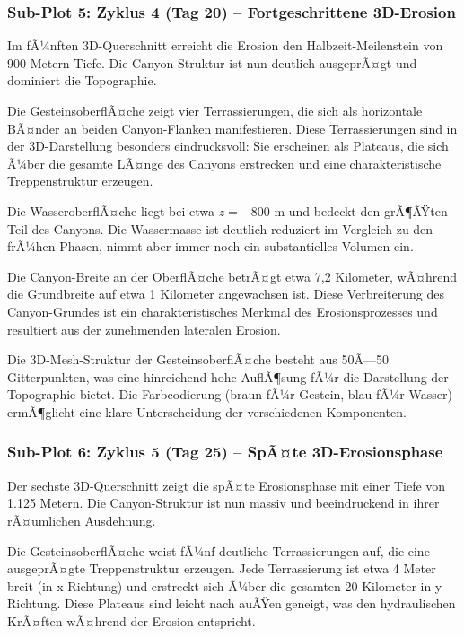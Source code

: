 \subsubsection*{Sub-Plot 5: Zyklus 4 (Tag 20) -- Fortgeschrittene 3D-Erosion}

Im fÃ¼nften 3D-Querschnitt erreicht die Erosion den Halbzeit-Meilenstein von 900 Metern Tiefe. Die Canyon-Struktur ist nun deutlich ausgeprÃ¤gt und dominiert die Topographie.

Die GesteinsoberflÃ¤che zeigt vier Terrassierungen, die sich als horizontale BÃ¤nder an beiden Canyon-Flanken manifestieren. Diese Terrassierungen sind in der 3D-Darstellung besonders eindrucksvoll: Sie erscheinen als Plateaus, die sich Ã¼ber die gesamte LÃ¤nge des Canyons erstrecken und eine charakteristische Treppenstruktur erzeugen.

Die WasseroberflÃ¤che liegt bei etwa $z = -800$ m und bedeckt den grÃ¶ÃŸten Teil des Canyons. Die Wassermasse ist deutlich reduziert im Vergleich zu den frÃ¼hen Phasen, nimmt aber immer noch ein substantielles Volumen ein.

Die Canyon-Breite an der OberflÃ¤che betrÃ¤gt etwa 7,2 Kilometer, wÃ¤hrend die Grundbreite auf etwa 1 Kilometer angewachsen ist. Diese Verbreiterung des Canyon-Grundes ist ein charakteristisches Merkmal des Erosionsprozesses und resultiert aus der zunehmenden lateralen Erosion.

Die 3D-Mesh-Struktur der GesteinsoberflÃ¤che besteht aus 50Ã—50 Gitterpunkten, was eine hinreichend hohe AuflÃ¶sung fÃ¼r die Darstellung der Topographie bietet. Die Farbcodierung (braun fÃ¼r Gestein, blau fÃ¼r Wasser) ermÃ¶glicht eine klare Unterscheidung der verschiedenen Komponenten.

\subsubsection*{Sub-Plot 6: Zyklus 5 (Tag 25) -- SpÃ¤te 3D-Erosionsphase}

Der sechste 3D-Querschnitt zeigt die spÃ¤te Erosionsphase mit einer Tiefe von 1.125 Metern. Die Canyon-Struktur ist nun massiv und beeindruckend in ihrer rÃ¤umlichen Ausdehnung.

Die GesteinsoberflÃ¤che weist fÃ¼nf deutliche Terrassierungen auf, die eine ausgeprÃ¤gte Treppenstruktur erzeugen. Jede Terrassierung ist etwa 4 Meter breit (in x-Richtung) und erstreckt sich Ã¼ber die gesamten 20 Kilometer in y-Richtung. Diese Plateaus sind leicht nach auÃŸen geneigt, was den hydraulischen KrÃ¤ften wÃ¤hrend der Erosion entspricht.

